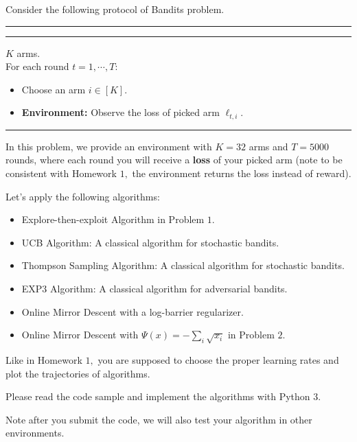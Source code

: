 \documentclass[11pt,oneside,a4paper]{article}
\begin{document}
\newpage
{}
\vspace{0.5cm}

\noindent Consider the following protocol of Bandits problem.
\vspace{0.05in}
\hrule
\vspace{0.05in}
\vspace{0.05in}
\hrule
\vspace{0.05in}

 $K$ arms. \\
\noindent For each round $t=1,\cdots, T:$ 
\begin{itemize}
\item {}  Choose an arm $i \in [K].$
\item {\bf Environment:} Observe the loss of picked arm $\ell_{t,i}.$
\end{itemize}
\vspace{0.02in}
\hrule
\vspace{0.1in}

\noindent In this problem, we provide an environment with $K=32$ arms and $T=5000$ rounds, where each round you will receive a \textbf{loss} of your picked arm (note to be consistent with Homework $1,$ the environment returns the loss instead of reward). 
\vspace{0.2cm}

\noindent Let's apply the following  algorithms: 
\begin{itemize}
    \item Explore-then-exploit Algorithm in Problem $1$.
    \item UCB Algorithm: A classical algorithm for stochastic bandits. 
    \item Thompson Sampling Algorithm: A classical algorithm for stochastic bandits. 
    \item EXP3 Algorithm: A classical algorithm for adversarial bandits.
    \item Online Mirror Descent with a log-barrier regularizer.
    \item Online Mirror Descent with $\Psi(x) = -\sum_i \sqrt{x_i}$ in Problem $2$.
\end{itemize}

\noindent Like in Homework $1,$ you are supposed to choose the proper learning rates and plot the trajectories of algorithms. 
\vspace{0.2cm}

\noindent  
Please read the code sample and implement the algorithms with Python $3$. 

\vspace{0.2cm}
\noindent Note after you submit the code, we will also test your algorithm in other environments. 

\vspace{0.5cm}
\end{document}
